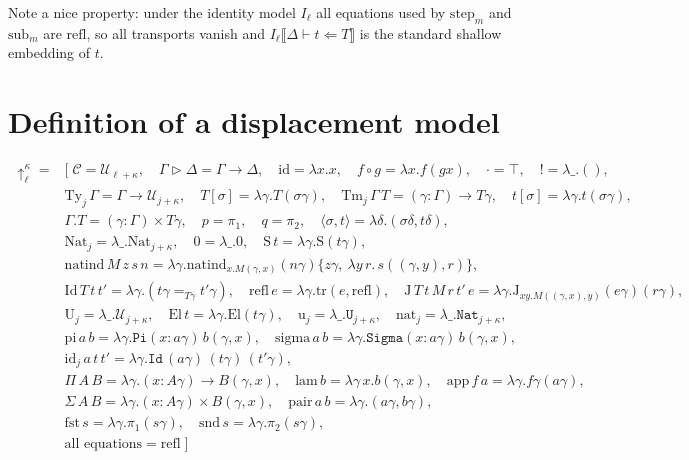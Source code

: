 Note a nice property: under the identity model
$I_\ell$ all equations used by $\mathrm{step}_m$ and
$\mathrm{sub}_m$ are $\mathrm{refl}$, so all transports
vanish and $I_\ell\llbracket\Delta\vdash t\Leftarrow T
\rrbracket$ is the standard shallow embedding of $t$.

\section{Definition of a displacement model}
\label{twoltt-displacement-model-def}

\[\begin{array}{ll}
    \uparrow^{\kappa}_{\ell} = &[\;
\mathcal C = \mathcal U_{\ell+\kappa},\quad
\Gamma\triangleright\Delta = \Gamma\to\Delta,\quad
\mathrm{id}=\lambda x.x,\quad f\circ g=\lambda x.f(gx),\quad
\cdot = \top,\quad {!}=\lambda\_.(),\\
&\mathrm{Ty}_j\,\Gamma=\Gamma\to\mathcal U_{j+\kappa},\quad T[\sigma]=\lambda\gamma.T(\sigma\gamma),\quad
\mathrm{Tm}_j\,\Gamma\,T=(\gamma:\Gamma)\to T\gamma,\quad t[\sigma]=\lambda\gamma.t(\sigma\gamma),\\
&\Gamma.T=(\gamma:\Gamma)\times T\gamma,\quad p=\pi_1,\quad q=\pi_2,\quad \langle\sigma,t\rangle=\lambda\delta.(\sigma\delta,t\delta),\\
&\mathrm{Nat}_j=\lambda\_.\mathrm{Nat}_{j+\kappa},\quad 0=\lambda\_.0,\quad \mathrm S\,t=\lambda\gamma.\mathrm S(t\gamma),\\
&\mathrm{natind}\,M\,z\,s\,n=\lambda\gamma.\mathrm{natind}_{x.M(\gamma,x)}(n\gamma)\{z\gamma,\ \lambda y\,r.\,s((\gamma,y),r)\},\\
&\mathrm{Id}\,T\,t\,t'=\lambda\gamma.(t\gamma=_{T\gamma}t'\gamma),\quad \mathrm{refl}\,e=\lambda\gamma.\mathrm{tr}(e,\mathrm{refl}),\quad
\mathrm J\,T\,t\,M\,r\,t'\,e=\lambda\gamma.\mathrm J_{xy.M((\gamma,x),y)}(e\gamma)(r\gamma),\\
&\mathrm U_j=\lambda\_.\mathcal U_{j+\kappa},\quad \mathrm{El}\,t=\lambda\gamma.\mathrm{El}(t\gamma),\quad
\mathrm u_j=\lambda\_.\mathtt U_{j+\kappa},\quad \mathrm{nat}_j=\lambda\_.\mathtt{Nat}_{j+\kappa},\\
&\mathrm{pi}\,a\,b=\lambda\gamma.\mathtt{Pi}(x:a\gamma)\,b(\gamma,x),\quad
\mathrm{sigma}\,a\,b=\lambda\gamma.\mathtt{Sigma}(x:a\gamma)\,b(\gamma,x),\\
&\mathrm{id}_j\,a\,t\,t'=\lambda\gamma.\mathtt{Id}\,(a\gamma)\,(t\gamma)\,(t'\gamma),\\
&\Pi\,A\,B=\lambda\gamma.(x:A\gamma)\to B(\gamma,x),\quad \mathrm{lam}\,b=\lambda\gamma\,x.b(\gamma,x),\quad \mathrm{app}\,f\,a=\lambda\gamma.f\gamma(a\gamma),\\
&\Sigma\,A\,B=\lambda\gamma.(x:A\gamma)\times B(\gamma,x),\quad \mathrm{pair}\,a\,b=\lambda\gamma.(a\gamma,b\gamma),\\
&\mathrm{fst}\,s=\lambda\gamma.\pi_1(s\gamma),\quad \mathrm{snd}\,s=\lambda\gamma.\pi_2(s\gamma),\\
&\text{all equations}=\mathrm{refl}
\;]
\end{array}
\]


